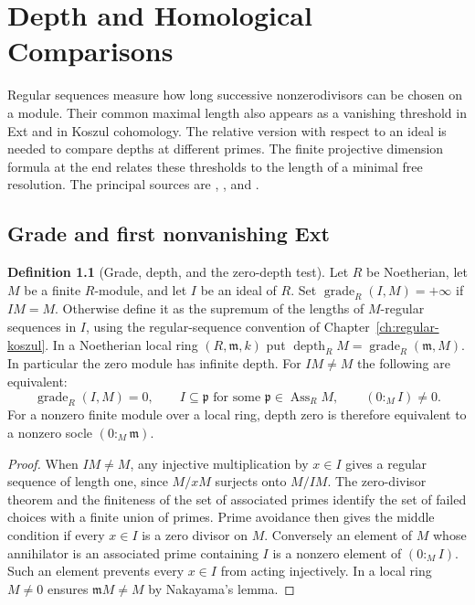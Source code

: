 \documentclass[11pt,oneside,openany]{book}
\theoremstyle{definition}
\newtheorem{definition}[theorem]{Definition}
\theoremstyle{remark}
\begin{document}
\chapter{Depth and Homological Comparisons}\label{ch:depth}

Regular sequences measure how long successive nonzerodivisors can be
chosen on a module. Their common maximal length also appears as a
vanishing threshold in Ext and in Koszul cohomology. The relative
version with respect to an ideal is needed to compare depths at
different primes. The finite projective dimension formula at the end
relates these thresholds to the length of a minimal free resolution.
The principal sources are \cite[Chapters 17--18]{eisenbud},
\cite[Sections 1.2--1.3 and 1.6]{brunsherzog}, and
\cite[Sections 16--17]{matsumura}.

\section{Grade and first nonvanishing Ext}

\begin{definition}[Grade, depth, and the zero-depth test]\label{res:DP-01}
Let $R$ be Noetherian, let $M$ be a finite $R$-module, and let $I$ be an
ideal of $R$. Set $\operatorname{grade}_R(I,M)=+\infty$ if $IM=M$.
Otherwise define it as the supremum of the lengths of $M$-regular
sequences in $I$, using the regular-sequence convention of
Chapter~\ref{ch:regular-koszul}. In a Noetherian local ring
$(R,\mathfrak m,k)$ put
$\operatorname{depth}_R M=\operatorname{grade}_R(\mathfrak m,M)$.
In particular the zero module has infinite depth. For $IM\ne M$ the
following are equivalent:
\[
 \operatorname{grade}_R(I,M)=0,\qquad
 I\subseteq\mathfrak p \text{ for some }\mathfrak p\in\operatorname{Ass}_R M,
 \qquad (0:_M I)\ne0.
\]
For a nonzero finite module over a local ring, depth zero is therefore
equivalent to a nonzero socle $(0:_M\mathfrak m)$.
\end{definition}
\begin{proof}
When $IM\ne M$, any injective multiplication by $x\in I$ gives a
regular sequence of length one, since $M/xM$ surjects onto $M/IM$.
The zero-divisor theorem and the finiteness of the set of associated
primes \cite[Theorems ALG-05-C02-S03 and ALG-05-C02-R03]{p103}
identify the set of failed choices with a finite union of primes.
Prime avoidance then gives the middle condition if every $x\in I$
is a zero divisor on $M$. Conversely an element of $M$ whose
annihilator is an associated prime containing $I$ is a nonzero
element of $(0:_M I)$. Such an element prevents every $x\in I$ from
acting injectively. In a local ring $M\ne0$ ensures $\mathfrak mM\ne M$
by Nakayama's lemma.
\end{proof}
\end{document}
